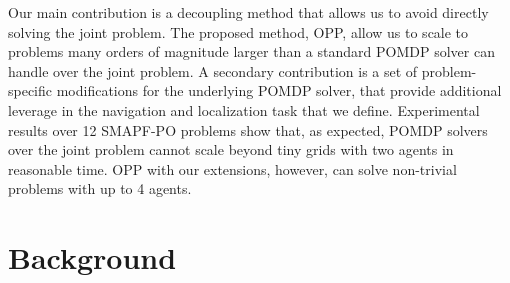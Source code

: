 \documentclass[letterpaper]{article} %
\begin{document}
Our main contribution is a decoupling method that allows us to avoid directly solving the joint problem. The proposed method, OPP, allow us to scale to problems many orders of magnitude larger than a standard POMDP solver can handle over the joint problem. A secondary contribution is a set of problem-specific modifications for the underlying POMDP solver, that provide additional leverage in the navigation and localization task that we define.
Experimental results over 12 SMAPF-PO problems show that, as expected, POMDP solvers over the joint problem cannot scale beyond tiny grids with two agents in reasonable time. OPP with our extensions, however, can solve non-trivial problems with up to 4 agents.%

































\section{Background}
\end{document}
